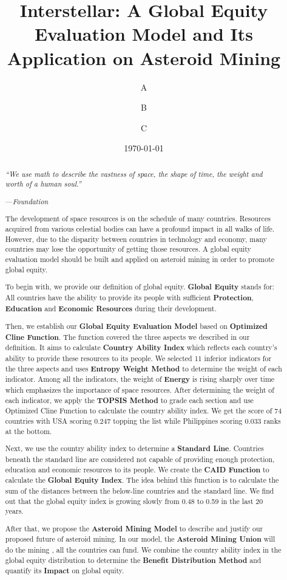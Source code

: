 \documentclass{mcmthesis}
\title{\textbf{Interstellar: A Global Equity Evaluation Model and Its Application on Asteroid Mining} }
\author{A \and B \and C}
\date{\today}
\begin{document}
\begin{abstract}
	\small
    \hfill \emph{``We use math to describe the vastness of space, the shape of time, the weight and worth of a human soul.''}

    \hfill ---\emph{Foundation}

The development of space resources is on the schedule of many countries. Resources acquired from various celestial bodies can have a profound impact in all walks of life. However, due to the disparity between countries in technology and economy, many countries may lose the opportunity of getting those resources. A global equity evaluation model should be built and applied on asteroid mining in order to promote global equity.

To begin with, we provide our definition of global equity. \textbf{Global Equity } stands for: All countries have the ability to provide its people with sufficient \textbf{Protection}, \textbf{Education} and \textbf{Economic Resources} during their development.

Then, we establish our \textbf{Global Equity Evaluation Model} based on \textbf{Optimized Cline Function}. The function covered the three aspects we described in our definition. It aims to calculate \textbf{Country Ability Index} which reflects each country's ability to provide these resources to its people. We selected 11 inferior indicators for the three aspects and uses \textbf{Entropy Weight Method} to determine the weight of each indicator. Among all the indicators, the weight of \textbf{Energy} is rising sharply over time which emphasizes the importance of space resources. After determining the weight of each indicator, we apply the \textbf{TOPSIS Method} to grade each section and use Optimized Cline Function to calculate the country ability index. We get the score of 74 countries with USA scoring 0.247 topping the list while Philippines scoring 0.033 ranks at the bottom. 

Next, we use the country ability index to determine a \textbf{Standard Line}. Countries beneath the standard line are considered not capable of providing enough protection, education and economic resources to its people. We create the \textbf{CAID Function} to calculate the \textbf{Global Equity Index}. The idea behind this function is to calculate the sum of the distances between the below-line countries and the standard line. We find out that the global equity index is growing slowly from 0.48 to 0.59 in the last 20 years.

After that, we propose the \textbf{Asteroid Mining Model} to describe and justify our proposed future of asteroid mining. In our model, the \textbf{Asteroid Mining Union} will do the mining , all the countries can fund. We combine the country ability index in the global equity distribution to determine the \textbf{Benefit Distribution Method} and quantify its \textbf{Impact} on global equity.


\end{abstract}
\end{document}
